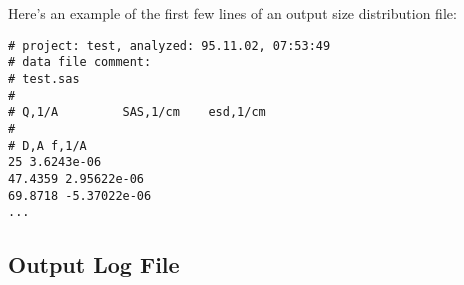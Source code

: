 \documentclass[letterpaper]{article}
\newlength{\fminilength}
\newenvironment{fminipage}[1][\linewidth]
 {\setlength{\fminilength}{#1}%
    \addtolength{\fminilength}{-2\fboxsep}%
    \addtolength{\fminilength}{-2\fboxrule}%
    \begin{lrbox}{\fminibox}\begin{minipage}{\fminilength}}
 {\end{minipage}\end{lrbox}\noindent\fbox{\usebox{\fminibox}}}
\begin{document}
Here's an example of the first few lines of an output 
size distribution file: \par
\begin{center}
\begin{fminipage}[0.8\linewidth]
\small\begin{verbatim}
# project: test, analyzed: 95.11.02, 07:53:49
# data file comment:
# test.sas
#
# Q,1/A         SAS,1/cm    esd,1/cm
#
# D,A f,1/A
25 3.6243e-06
47.4359 2.95622e-06
69.8718 -5.37022e-06
...
\end{verbatim}
\end{fminipage}
\end{center}

\subsection{Output Log File}
\end{document}
